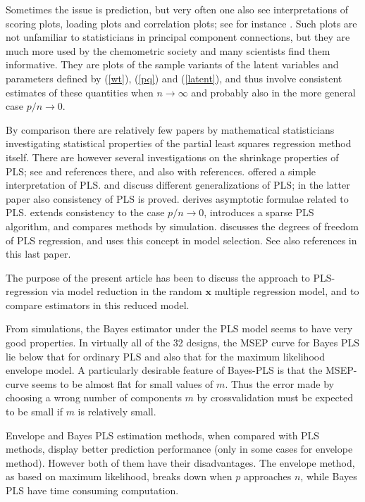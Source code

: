 \documentclass[a4paper, 11pt]{article}
\begin{document}
Sometimes the issue is prediction, but very often one also see interpretations of scoring plots, loading plots and correlation plots; see for instance \citet{martens2001multivariate}. Such plots are not unfamiliar to statisticians in principal component connections, but they are much more used by the chemometric society and many scientists find them informative. They are plots of the sample variants of the latent variables and parameters defined by (\ref{wt}), (\ref{pq}) and (\ref{latent}), and thus involve consistent estimates of these quantities when $n\rightarrow\infty$ and probably also in the more general case $p/n\rightarrow 0$.

By comparison there are relatively few papers by mathematical statisticians
investigating statistical properties of the partial least squares regression
method itself. There are however several investigations on the shrinkage
properties of PLS; see \citet{kramer2007overview} and references there, and also \citet{foschigeometry} with references. \citet{garthwaite1994interpretation} offered a simple interpretation of PLS. \citet{stone1990continuum} and \citet{naik2000partial} discuss different generalizations of PLS; in the latter paper also consistency of PLS is proved. \citet{stoica1998partial} derives asymptotic formulae related to PLS. \citet{chun2010sparse} extends consistency to the case $p/n\rightarrow 0$, introduces a sparse PLS algorithm, and compares methods by simulation. \citet{kramer2012degrees} discusses the degrees of freedom of PLS regression, and uses this concept in model selection. See also references in this last paper.

The purpose of the present article has been to discuss the approach to PLS-regression via model reduction in the random $\bm{x}$ multiple regression model, and to compare estimators in this reduced model.

From simulations, the Bayes estimator under the PLS model seems to have very good properties. In virtually all of the 32 designs, the MSEP curve for Bayes PLS lie below that for ordinary PLS and also that for the maximum likelihood envelope model. A particularly desirable feature of Bayes-PLS is that the MSEP-curve seems to be almost flat for small values of $m$. Thus the error made by choosing a wrong number of components $m$ by crossvalidation must be expected to be small if $m$ is relatively small.

Envelope and Bayes PLS estimation methods, when compared with PLS methods, display better prediction performance (only in some cases for envelope method). However both of them have their disadvantages. The envelope method, as based on maximum likelihood, breaks down when $p$ approaches $n$, while Bayes PLS have time consuming computation.
\end{document}
